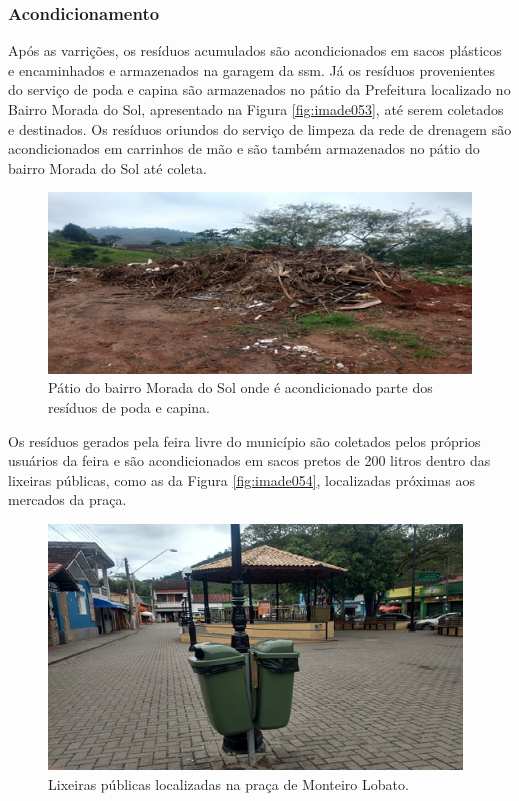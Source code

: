 \subsubsection{Acondicionamento}

Após as varrições, os resíduos acumulados são acondicionados em sacos plásticos e encaminhados e armazenados na garagem da \gls{ssm}.  Já os resíduos provenientes do serviço de poda e capina são armazenados no pátio da Prefeitura localizado no Bairro Morada do Sol, apresentado na Figura \ref{fig:imade053}, até serem coletados e destinados. Os resíduos oriundos do serviço de limpeza da rede de drenagem são acondicionados em carrinhos de mão e são também armazenados no pátio do bairro Morada do Sol até coleta.


\begin{figure}
	\centering
	\includegraphics[width=0.75\linewidth]{produtos/prodtres/image053}
	\caption{Pátio do bairro Morada do Sol onde é acondicionado parte dos resíduos de poda e capina.}
	\label{fig:image053}
\end{figure}

Os resíduos gerados pela feira livre do município são coletados pelos próprios usuários da feira e são acondicionados em sacos pretos de 200 litros dentro das lixeiras públicas, como as da Figura \ref{fig:imade054}, localizadas próximas aos mercados da praça.

\begin{figure}
	\centering
	\includegraphics[width=0.7\linewidth]{produtos/prodtres/image054}
	\caption{Lixeiras públicas localizadas na praça de Monteiro Lobato.}
	\label{fig:image054}
\end{figure}


